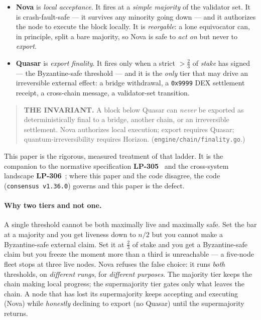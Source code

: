 \documentclass[11pt,a4paper]{article}
\begin{document}
\begin{itemize}[leftmargin=1.4em]
\item \textbf{Nova} is \emph{local acceptance}. It fires at a \emph{simple majority} of the
validator set. It is crash-fault-safe --- it survives any minority going down --- and it
authorizes the node to execute the block locally. It is \emph{reorgable}: a lone equivocator
can, in principle, split a bare majority, so Nova is safe to \emph{act on} but never to
\emph{export}.
\item \textbf{Quasar} is \emph{export finality}. It fires only when a strict
\(>\tfrac{2}{3}\) of \emph{stake} has signed --- the Byzantine-safe threshold --- and it is
the \emph{only} tier that may drive an irreversible external effect: a bridge withdrawal, a
\texttt{0x9999} DEX settlement receipt, a cross-chain message, a validator-set transition.
\end{itemize}

\begin{quote}
\textbf{THE INVARIANT.} A block below Quasar can \emph{never} be exported as
deterministically final to a bridge, another chain, or an irreversible settlement. Nova
authorizes local execution; export requires Quasar; quantum-irreversibility requires
Horizon. (\texttt{engine/chain/finality.go}.)
\end{quote}

This paper is the rigorous, measured treatment of that ladder. It is the companion to the
normative specification \textbf{LP-305}~\cite{lp305} and the cross-system landscape
\textbf{LP-306}~\cite{lp306}; where this paper and the code disagree, the code
(\texttt{consensus v1.36.0}) governs and this paper is the defect.

\paragraph{Why two tiers and not one.} A single threshold cannot be both maximally live and
maximally safe. Set the bar at a majority and you get liveness down to \(n/2\) but you
cannot make a Byzantine-safe external claim. Set it at \(\tfrac{2}{3}\) of stake and you get
a Byzantine-safe claim but you freeze the moment more than a third is unreachable --- a
five-node fleet stops at three live nodes. Nova refuses the false choice: it runs \emph{both}
thresholds, on \emph{different rungs}, for \emph{different purposes}. The majority tier keeps
the chain making local progress; the supermajority tier gates only what leaves the chain. A
node that has lost its supermajority keeps accepting and executing (Nova) while \emph{honestly}
declining to export (no Quasar) until the supermajority returns.
\end{document}

